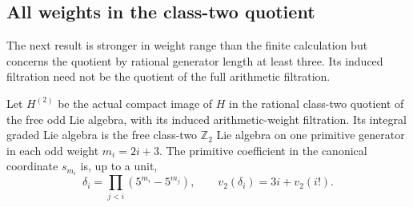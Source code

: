 \subsection{All weights in the class-two quotient}

The next result is stronger in weight range than the finite
calculation but concerns the quotient by rational generator
length at least three. Its induced filtration need not be the
quotient of the full arithmetic filtration.

\begin{theorem}[K17-2-CLASS2]\label{thm:2-class2}
Let $H^{(2)}$ be the actual compact image of $H$ in the rational
class-two quotient of the free odd Lie algebra, with its induced
arithmetic-weight filtration. Its integral graded Lie algebra
is the free class-two $\mathbb Z_2$ Lie algebra on one primitive
generator in each odd weight $m_i=2i+3$. The primitive coefficient
in the canonical coordinate $s_{m_i}$ is, up to a unit,
\[
 \delta_i=\prod_{j<i}(5^{m_i}-5^{m_j}),\qquad
 v_2(\delta_i)=3i+v_2(i!).
\]
\end{theorem}

